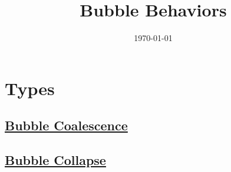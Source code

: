 \documentclass[11pt]{article}
\date{\today}
\title{Bubble Behaviors}
\begin{document}
\maketitle
\tableofcontents

\section{Types}
\label{sec:orge6b799d}
\subsection{\href{20240313123131-coalescence.org}{Bubble Coalescence}}
\label{sec:org901f40d}
\subsection{\href{20240313123823-bubble_collapse.org}{Bubble Collapse}}
\label{sec:orga69f24e}
\end{document}
